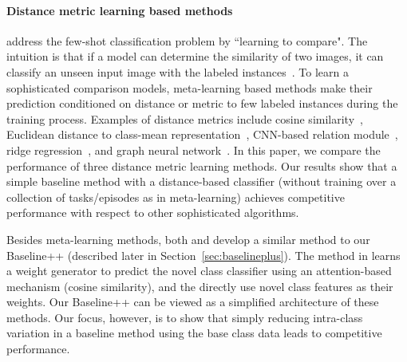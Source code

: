 \documentclass{article}
\newlength\paramargin
\newcommand{\secref}[1]{Section~\ref{sec:#1}}
\begin{document}
\paragraph{Distance metric learning based methods} address the few-shot classification problem by ``learning to compare". The intuition is that if a model can determine the similarity of two images, it can classify an unseen input image with the labeled instances~\cite{koch2015siamese}.
To learn a sophisticated comparison models, meta-learning based methods make their prediction conditioned on distance or metric to few labeled instances during the training process. Examples of distance metrics include cosine similarity~\cite{vinyals2016matching}, Euclidean distance to class-mean representation~\cite{snell2017prototypical}, CNN-based relation module~\cite{sung2018learning}, ridge regression~\cite{bertinetto2019meta}, and graph neural network~\cite{garcia2018few}. In this paper, we compare the performance of three distance metric learning methods. Our results show that a simple baseline method with a distance-based classifier (without training over a collection of tasks/episodes as in meta-learning) achieves competitive performance with respect to other sophisticated algorithms.




Besides meta-learning methods, both \cite{gidaris2018dynamic} and \cite{qi2018low} develop a similar method to our Baseline++ (described later in \secref{baselineplus}).  
The method in \cite{gidaris2018dynamic} learns a weight generator to predict the novel class classifier using an attention-based mechanism (cosine similarity), and the \cite{qi2018low} directly use novel class features as their weights. Our Baseline++ can be viewed as a simplified architecture of these methods. Our focus, however, is to show that simply reducing intra-class variation in a baseline method using the base class data leads to competitive performance. 


\vspace{\paramargin}
\end{document}
